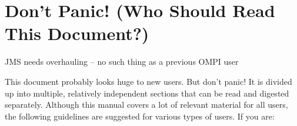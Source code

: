 %
% 
% 
%

\chapter{Don't Panic! (Who Should Read This Document?)}

{\Huge JMS needs overhauling -- no such thing as a previous OMPI user}

This document probably looks huge to new users.  But don't panic!  It
is divided up into multiple, relatively independent sections that can
be read and digested separately.  Although this manual covers a lot of
relevant material for all users, the following guidelines are
suggested for various types of users.  If you are:

